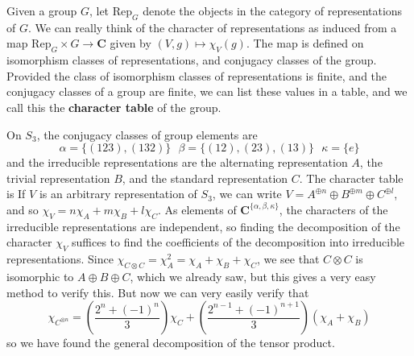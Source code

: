 Given a group $G$, let $\text{Rep}_G$ denote the objects in the category of representations of $G$. We can really think of the character of representations as induced from a map $\text{Rep}_G \times G \to \mathbf{C}$ given by $(V,g) \mapsto \chi_V(g)$. The map is defined on isomorphism classes of representations, and conjugacy classes of the group. Provided the class of isomorphism classes of representations is finite, and the conjugacy classes of a group are finite, we can list these values in a table, and we call this the {\bf character table} of the group.

\begin{example}
    On $S_3$, the conjugacy classes of group elements are
    \[ \alpha = \{ (123), (132) \}\ \ \ \beta = \{ (12), (23), (13) \}\ \ \ \kappa = \{ e \} \]
    and the irreducible representations are the alternating representation $A$, the trivial representation $B$, and the standard representation $C$. The character table is
    If $V$ is an arbitrary representation of $S_3$, we can write $V = A^{\oplus n} \oplus B^{\oplus m} \oplus C^{\oplus l}$, and so $\chi_V = n \chi_A + m \chi_B + l \chi_C$. As elements of $\mathbf{C}^{\{ \alpha, \beta, \kappa \}}$, the characters of the irreducible representations are independent, so finding the decomposition of the character $\chi_V$ suffices to find the coefficients of the decomposition into irreducible representations. Since $\chi_{C \otimes C} = \chi_A^2 = \chi_A + \chi_B + \chi_C$, we see that $C \otimes C$ is isomorphic to $A \oplus B \oplus C$, which we already saw, but this gives a very easy method to verify this. But now we can very easily verify that
    \[ \chi_{C^{\otimes n}} = \left( \frac{2^n + (-1)^n}{3} \right) \chi_C + \left( \frac{2^{n-1} + (-1)^{n+1}}{3} \right) \left( \chi_A + \chi_B \right) \]
    so we have found the general decomposition of the tensor product.
\end{example}

